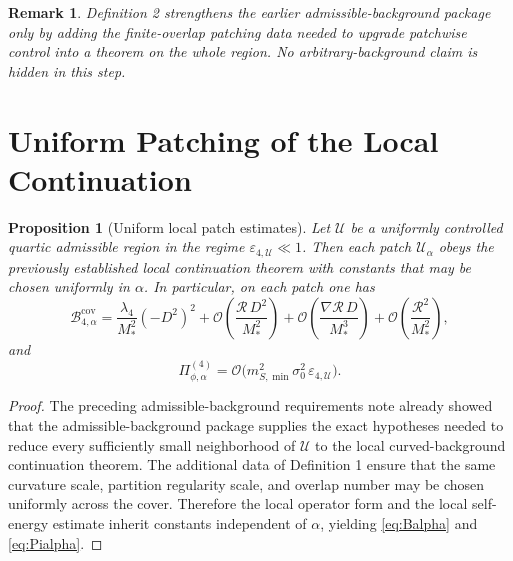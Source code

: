 \documentclass[11pt]{article}
\newtheorem{proposition}{Proposition}
\newtheorem{remark}{Remark}
\begin{document}
\begin{remark}
Definition 2 strengthens the earlier admissible-background package only by adding the finite-overlap patching data needed to upgrade patchwise control into a theorem on the whole region. No arbitrary-background claim is hidden in this step.
\end{remark}

\section{Uniform Patching of the Local Continuation}

\begin{proposition}[Uniform local patch estimates]
Let \(\mathcal U\) be a uniformly controlled quartic admissible region in the regime \(\varepsilon_{4,\mathcal U}\ll 1\). Then each patch \(\mathcal U_\alpha\) obeys the previously established local continuation theorem with constants that may be chosen uniformly in \(\alpha\). In particular, on each patch one has
\begin{equation}
\mathcal B_{4,\alpha}^{\mathrm{cov}}
=
\frac{\lambda_4}{M_*^2}(-D^2)^2
+ \mathcal O\!\left(\frac{\mathcal R\,D^2}{M_*^2}\right)
+ \mathcal O\!\left(\frac{\nabla\mathcal R\,D}{M_*^3}\right)
+ \mathcal O\!\left(\frac{\mathcal R^2}{M_*^2}\right),
\label{eq:Balpha}
\end{equation}
and
\begin{equation}
\Pi_{\phi,\alpha}^{(4)}
=
\mathcal O\!\bigl(m_{S,\min}^2\sigma_0^2\,\varepsilon_{4,\mathcal U}\bigr).
\label{eq:Pialpha}
\end{equation}
\end{proposition}

\begin{proof}
The preceding admissible-background requirements note already showed that the admissible-background package supplies the exact hypotheses needed to reduce every sufficiently small neighborhood of \(\mathcal U\) to the local curved-background continuation theorem. The additional data of Definition 1 ensure that the same curvature scale, partition regularity scale, and overlap number may be chosen uniformly across the cover. Therefore the local operator form and the local self-energy estimate inherit constants independent of \(\alpha\), yielding \eqref{eq:Balpha} and \eqref{eq:Pialpha}.
\end{proof}
\end{document}
